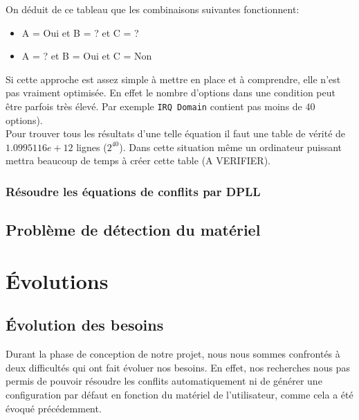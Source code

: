 \documentclass[16pts]{report}
\begin{document}
On déduit de ce tableau que les combinaisons suivantes fonctionnent:
\begin{itemize}
    \item A = Oui et B = ?   et C = ?   \\
    \item A = ?   et B = Oui et C = Non \\
\end{itemize}

Si cette approche est assez simple à mettre en place et à comprendre, elle
n'est pas vraiment optimisée. En effet le nombre d'options dans une condition
peut être parfois très élevé. Par exemple \verb|IRQ Domain| contient pas
moins de 40 options).\\
Pour trouver tous les résultats d'une telle équation il faut une table
de vérité de $1.0995116e+12$ lignes ($2^{40}$). Dans cette situation même
un ordinateur puissant mettra beaucoup de temps à créer cette table (A
VERIFIER).
\\


            \subsubsection{Résoudre les équations de conflits par DPLL}
            \label{sub:Résoudre les équations de conflits par DPLL}

        \subsection{Problème de détection du matériel}
        \label{sub:Problème de détection du matériel}

    \section{Évolutions}
    \label{sec:Évolutions}
        \subsection{Évolution des besoins}
        \label{sec:Évolution des besoins}

Durant la phase de conception de notre projet, nous nous sommes confrontés à 
deux difficultés qui ont fait évoluer nos besoins. En effet, nos recherches 
nous pas permis de pouvoir résoudre les conflits automatiquement ni de générer 
une configuration par défaut en fonction du matériel de l'utilisateur, comme
cela a été évoqué précédemment. 
\\
\end{document}
